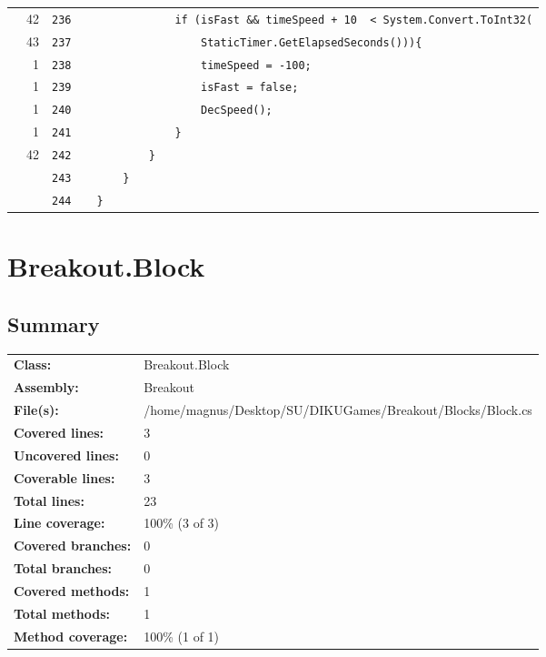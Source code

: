 \documentclass[a4paper,landscape,10pt]{article}
\begin{document}
\begin{longtable}[l]{lrrll}
\cellcolor{green} & 42 & \verb~236~ & & \verb~            if (isFast && timeSpeed + 10  < System.Convert.ToInt32(~\\
\cellcolor{green} & 43 & \verb~237~ & & \verb~                StaticTimer.GetElapsedSeconds())){~\\
\cellcolor{green} & 1 & \verb~238~ & & \verb~                timeSpeed = -100;~\\
\cellcolor{green} & 1 & \verb~239~ & & \verb~                isFast = false;~\\
\cellcolor{green} & 1 & \verb~240~ & & \verb~                DecSpeed();~\\
\cellcolor{green} & 1 & \verb~241~ & & \verb~            }~\\
\cellcolor{green} & 42 & \verb~242~ & & \verb~        }~\\
\cellcolor{gray} &  & \verb~243~ & & \verb~    }~\\
\cellcolor{gray} &  & \verb~244~ & & \verb~}~\\
\end{longtable}
\newpage
\section{Breakout.Block}
\subsection{Summary}
\begin{longtable}[l]{ll}
\textbf{Class:} & Breakout.Block\\
\textbf{Assembly:} & Breakout\\
\textbf{File(s):} & \begin{minipage}[t]{12cm}{/home/magnus/Desktop/SU/DIKUGames/Breakout/Blocks/Block.cs}\end{minipage} \\
\textbf{Covered lines:} & 3\\
\textbf{Uncovered lines:} & 0\\
\textbf{Coverable lines:} & 3\\
\textbf{Total lines:} & 23\\
\textbf{Line coverage:} & 100\% (3 of 3)\\
\textbf{Covered branches:} & 0\\
\textbf{Total branches:} & 0\\
\textbf{Covered methods:} & 1\\
\textbf{Total methods:} & 1\\
\textbf{Method coverage:} & 100\% (1 of 1)\\
\end{longtable}
\end{document}
